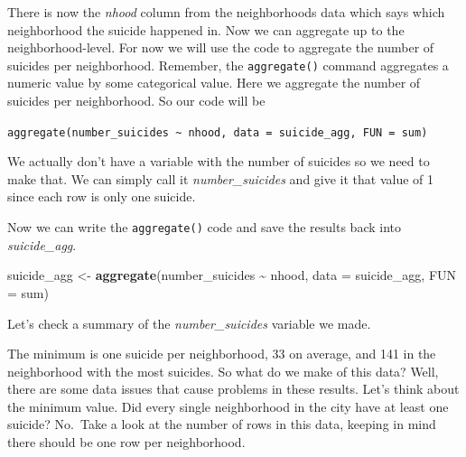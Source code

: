 \documentclass[
  12pt,
]{book}
\newenvironment{Shaded}{\begin{snugshade}}{\end{snugshade}}
\newcommand{\CommentTok}[1]{\textcolor[rgb]{0.37,0.37,0.37}{\textit{#1}}}
\newcommand{\DataTypeTok}[1]{\textcolor[rgb]{0.27,0.27,0.27}{#1}}
\newcommand{\DecValTok}[1]{\textcolor[rgb]{0.06,0.06,0.06}{#1}}
\newcommand{\KeywordTok}[1]{\textcolor[rgb]{0.27,0.27,0.27}{\textbf{#1}}}
\newcommand{\NormalTok}[1]{#1}
\newcommand{\OperatorTok}[1]{\textcolor[rgb]{0.43,0.43,0.43}{\textbf{#1}}}
\newcommand{\StringTok}[1]{\textcolor[rgb]{0.5,0.5,0.5}{#1}}
\begin{document}
There is now the \emph{nhood} column from the neighborhoods data which says which neighborhood the suicide happened in. Now we can aggregate up to the neighborhood-level.
For now we will use the code to aggregate the number of suicides per neighborhood. Remember, the \texttt{aggregate()} command aggregates a numeric value by some categorical value. Here we aggregate the number of suicides per neighborhood. So our code will be

\texttt{aggregate(number\_suicides\ \textasciitilde{}\ nhood,\ data\ =\ suicide\_agg,\ FUN\ =\ sum)}

We actually don't have a variable with the number of suicides so we need to make that. We can simply call it \emph{number\_suicides} and give it that value of 1 since each row is only one suicide.

\begin{Shaded}
\end{Shaded}

Now we can write the \texttt{aggregate()} code and save the results back into \emph{suicide\_agg}.

\begin{Shaded}
\begin{Highlighting}[]
\NormalTok{suicide\_agg <{-}}\StringTok{ }\KeywordTok{aggregate}\NormalTok{(number\_suicides }\OperatorTok{\textasciitilde{}}\StringTok{ }\NormalTok{nhood, }\DataTypeTok{data =}\NormalTok{ suicide\_agg, }\DataTypeTok{FUN =}\NormalTok{ sum)}
\end{Highlighting}
\end{Shaded}

Let's check a summary of the \emph{number\_suicides} variable we made.

\begin{Shaded}
\end{Shaded}

The minimum is one suicide per neighborhood, 33 on average, and 141 in the neighborhood with the most suicides. So what do we make of this data? Well, there are some data issues that cause problems in these results. Let's think about the minimum value. Did every single neighborhood in the city have at least one suicide? No.~Take a look at the number of rows in this data, keeping in mind there should be one row per neighborhood.
\end{document}
